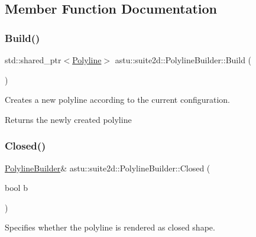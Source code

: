 \subsection{Member Function Documentation}
\mbox{\label{classastu_1_1suite2d_1_1PolylineBuilder_aefeb3a1648e8d9a3279f994c60938d1e}} 
\subsubsection{\texorpdfstring{Build()}{Build()}}
{\footnotesize\ttfamily std\+::shared\+\_\+ptr$<$\hyperlink{classastu_1_1suite2d_1_1Polyline}{Polyline}$>$ astu\+::suite2d\+::\+Polyline\+Builder\+::\+Build (\begin{DoxyParamCaption}{ }\end{DoxyParamCaption})\hspace{0.3cm}{\ttfamily [inline]}}

Creates a new polyline according to the current configuration.

\begin{DoxyReturn}{Returns}
the newly created polyline 
\end{DoxyReturn}
\mbox{\label{classastu_1_1suite2d_1_1PolylineBuilder_a62ad72073b3642bb70f08c1a7ae99783}} 
\subsubsection{\texorpdfstring{Closed()}{Closed()}}
{\footnotesize\ttfamily \hyperlink{classastu_1_1suite2d_1_1PolylineBuilder}{Polyline\+Builder}\& astu\+::suite2d\+::\+Polyline\+Builder\+::\+Closed (\begin{DoxyParamCaption}\item[{bool}]{b }\end{DoxyParamCaption})\hspace{0.3cm}{\ttfamily [inline]}}

Specifies whether the polyline is rendered as closed shape.


